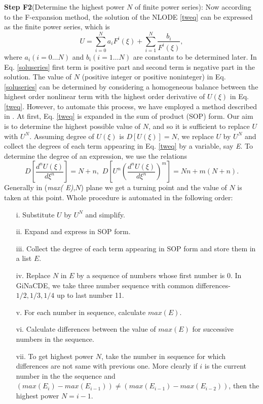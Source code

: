 \documentclass[prd,aps,floats,showkeys,nofootinbib,notitlepage]{revtex4}
\begin{document}
	\textbf{Step F2}(Determine the highest power $N$ of finite power series): 
	Now according to the F-expansion method, the solution of the NLODE \eqref{tweq} can be expressed as the finite power series, which is
	\begin{equation}\label{soluseries}
		U =  \sum\limits_{i = 0}^N {a_i{F^i}(\xi )}+\sum\limits_{i = 1}^N {\frac{{{b_i}}}{{F^i}(\xi )}},
	\end{equation}
	where $a_i(i=0\ldots N)$ and $b_i(i=1\ldots N)$ are constants to be determined later.
	In Eq. \eqref{soluseries} first term is positive part and second term is negative part in the solution. The value of $N$ (positive integer or positive noninteger) in Eq. \eqref{soluseries} can be determined by considering a homogeneous balance between the highest order nonlinear term with the highest order derivative of $U(\xi)$ in Eq. \eqref{tweq}.
	However, to automate this process, we have employed a method described in \cite{rath}. At first, Eq. \eqref{tweq} is expanded in the sum of product (SOP) form. Our aim is to determine the highest possible value of $N$, and so it is sufficient to replace $U$ with $U^N$. Assuming degree of $U(\xi)$ is $D[U(\xi)]=N$, we replace $U$ by $U^N$ and collect the degrees of each term appearing in Eq. \eqref{tweq} by a variable, say {\em E}. To determine the degree of an expression, we use the relations
	\begin{equation}\label{degRltn}
		D\left[ {\frac{{{d^n}U(\xi )}}{{d{\xi ^n}}}} \right] = N + n,\,\,D\left[ {{U^n}{{\left( {\frac{{{d^n}U(\xi )}}{{d{\xi ^n}}}} \right)}^m}} \right] = Nn + m(N + n).
	\end{equation}
	Generally in ({\em max( E)},$N$) plane we get a turning point and the value of $N$ is taken at this point. Whole procedure is automated in the following order:
	\begin{itemize}
		\item[i.] Substitute $U$ by $U^N$ and simplify.
		\item[ii.] Expand and express in SOP form.
		\item[iii.] Collect the degree of each term appearing in SOP form and store them in a list $ E$.
		\item[iv.] Replace $N$ in $E$ by a sequence of numbers whose first number is 0. In GiNaCDE, we take three  number sequence with common differences- $1/2,1/3,1/4$ up to last number 11.
		\item[v.] For each number in sequence, calculate $ max( E)$.
		\item[vi.] Calculate differences between the value of  $ max( E)$ for successive numbers in the sequence.
		\item[vii.] To get highest power $N$, take the number in sequence for which differences are not same with previous one. More clearly if $i$ is the current number in the the sequence and $ ({max(E_i)} - {max(E_{i - 1})}) \ne ({max(E_{i - 1})} - {max(E_{i - 2})})$, then the highest power $N=i-1$.   
	\end{itemize}
\end{document}
